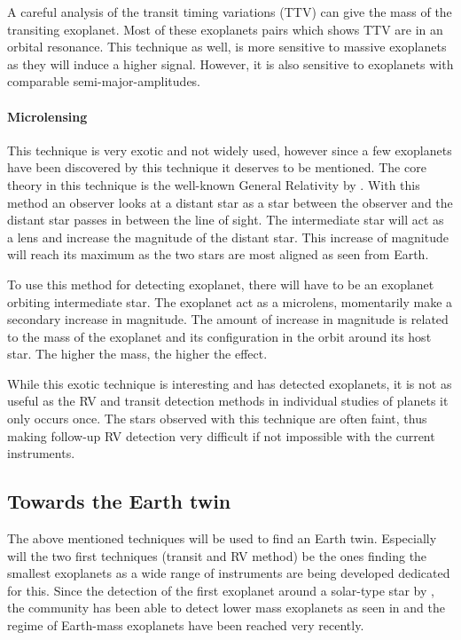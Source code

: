 A careful analysis of the transit timing variations (TTV) can give the mass of the transiting
exoplanet. Most of these exoplanets pairs which shows TTV are in an orbital resonance. This
technique as well, is more sensitive to massive exoplanets as they will induce a higher signal.
However, it is also sensitive to exoplanets with comparable semi-major-amplitudes.


\paragraph{Microlensing}

This technique is very exotic and not widely used, however since a few exoplanets have been
discovered by this technique it deserves to be mentioned. The core theory in this technique is the
well-known General Relativity by \citet{Einstein1916}. With this method an observer looks at a
distant star as a star between the observer and the distant star passes in between the line of
sight. The intermediate star will act as a lens and increase the magnitude of the distant star. This
increase of magnitude will reach its maximum as the two stars are most aligned as seen from Earth.

To use this method for detecting exoplanet, there will have to be an exoplanet orbiting intermediate
star. The exoplanet act as a microlens, momentarily make a secondary increase in magnitude. The
amount of increase in magnitude is related to the mass of the exoplanet and its configuration in the
orbit around its host star. The higher the mass, the higher the effect.

While this exotic technique is interesting and has detected exoplanets, it is not as useful as the
RV and transit detection methods in individual studies of planets it only occurs once. The stars
observed with this technique are often faint, thus making follow-up RV detection very difficult if
not impossible with the current instruments.


\subsection{Towards the Earth twin}

The above mentioned techniques will be used to find an Earth twin. Especially will the two first
techniques (transit and RV method) be the ones finding the smallest exoplanets as a wide range of
instruments are being developed dedicated for this. Since the detection of the first exoplanet
around a solar-type star by \citet{Mayor1995}, the community has been able to detect lower mass
exoplanets as seen in  and the regime of Earth-mass exoplanets have been
reached very recently.

